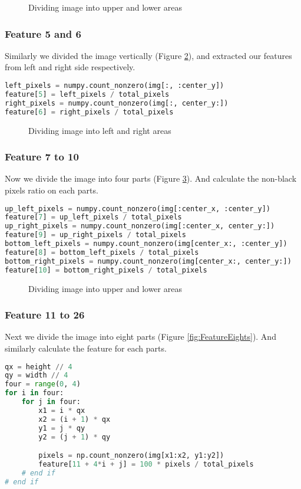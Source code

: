 \documentclass{standalone}
\begin{document}
\begin{figure}
\centering
\caption{Dividing image into upper and lower areas}
\label{fig:FeatureHor}
\end{figure}

\subsubsection{Feature 5 and 6}
Similarly we divided the image vertically (Figure \ref{fig:FeatureVer}), and extracted our features from left and right side respectively.
\begin{lstlisting}[language=Python]
left_pixels = numpy.count_nonzero(img[:, :center_y])
feature[5] = left_pixels / total_pixels
right_pixels = numpy.count_nonzero(img[:, center_y:])
feature[6] = right_pixels / total_pixels
\end{lstlisting}

\begin{figure}
\centering
\caption{Dividing image into left and right areas}
\label{fig:FeatureVer}
\end{figure}


\subsubsection{Feature 7 to 10}
Now we divide the image into four parts (Figure \ref{fig:FeatureFours}). And calculate the non-black pixels ratio on each parts.
\begin{lstlisting}[language=Python]
up_left_pixels = numpy.count_nonzero(img[:center_x, :center_y])
feature[7] = up_left_pixels / total_pixels
up_right_pixels = numpy.count_nonzero(img[:center_x, center_y:])
feature[9] = up_right_pixels / total_pixels
bottom_left_pixels = numpy.count_nonzero(img[center_x:, :center_y])
feature[8] = bottom_left_pixels / total_pixels
bottom_right_pixels = numpy.count_nonzero(img[center_x:, center_y:])
feature[10] = bottom_right_pixels / total_pixels
\end{lstlisting}

\begin{figure}
\centering
\caption{Dividing image into upper and lower areas}
\label{fig:FeatureFours}
\end{figure}

\subsubsection{Feature 11 to 26}
Next we divide the image into eight parts (Figure \ref{fig:FeatureEights}). And similarly calculate the feature for each parts.
\begin{lstlisting}[language=Python]
qx = height // 4
qy = width // 4
four = range(0, 4)
for i in four:
    for j in four:
        x1 = i * qx
        x2 = (i + 1) * qx
        y1 = j * qy
        y2 = (j + 1) * qy

        pixels = np.count_nonzero(img[x1:x2, y1:y2])
        feature[11 + 4*i + j] = 100 * pixels / total_pixels
    # end if
# end if
\end{lstlisting}
\end{document}
